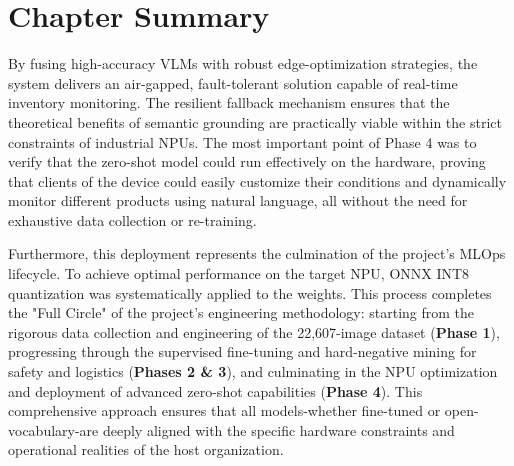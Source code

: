 \clearpage
\section{Chapter Summary}
By fusing high-accuracy VLMs with robust edge-optimization strategies, the system delivers an air-gapped, fault-tolerant solution capable of real-time inventory monitoring. The resilient fallback mechanism ensures that the theoretical benefits of semantic grounding are practically viable within the strict constraints of industrial NPUs. The most important point of Phase 4 was to verify that the zero-shot model could run effectively on the hardware, proving that clients of the device could easily customize their conditions and dynamically monitor different products using natural language, all without the need for exhaustive data collection or re-training.

Furthermore, this deployment represents the culmination of the project's MLOps lifecycle. To achieve optimal performance on the target NPU, ONNX INT8 quantization was systematically applied to the weights. This process completes the "Full Circle" of the project's engineering methodology: starting from the rigorous data collection and engineering of the 22,607-image dataset (\textbf{Phase 1}), progressing through the supervised fine-tuning and hard-negative mining for safety and logistics (\textbf{Phases 2 \& 3}), and culminating in the NPU optimization and deployment of advanced zero-shot capabilities (\textbf{Phase 4}). This comprehensive approach ensures that all models-whether fine-tuned or open-vocabulary-are deeply aligned with the specific hardware constraints and operational realities of the host organization.



